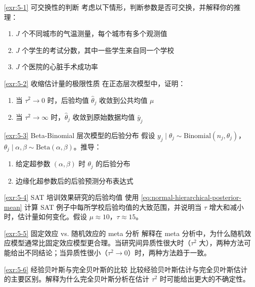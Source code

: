 \begin{Exercise}{\ref{exr:5-1} 可交换性的判断}\label{exr:5-1}
考虑以下情形，判断参数是否可交换，并解释你的推理：
\begin{enumerate}
  \item $J$ 个不同城市的气温测量，每个城市有多个观测值
  \item $J$ 个学生的考试分数，其中一些学生来自同一个学校
  \item $J$ 个医院的心脏手术成功率
\end{enumerate}
\end{Exercise}

\begin{Exercise}{\ref{exr:5-2} 收缩估计量的极限性质}\label{exr:5-2}
在正态层次模型中，证明：
\begin{enumerate}
  \item 当 $\tau^2 \to 0$ 时，后验均值 $\hat{\theta}_j$ 收敛到公共均值 $\mu$
  \item 当 $\tau^2 \to \infty$ 时，$\hat{\theta}_j$ 收敛到原始数据均值 $\bar{y}_j$
\end{enumerate}
\end{Exercise}

\begin{Exercise}{\ref{exr:5-3} Beta-Binomial 层次模型的后验分布}\label{exr:5-3}
假设 $y_j \mid \theta_j \sim \mathrm{Binomial}(n_j, \theta_j)$，$\theta_j \mid \alpha, \beta \sim \mathrm{Beta}(\alpha, \beta)$。推导：
\begin{enumerate}
  \item 给定超参数 $(\alpha, \beta)$ 时 $\theta_j$ 的后验分布
  \item 边缘化超参数后的后验预测分布表达式
\end{enumerate}
\end{Exercise}

\begin{Exercise}{\ref{exr:5-4} SAT 培训效果研究的后验均值}\label{exr:5-4}
使用 \eqref{eq:normal-hierarchical-posterior-mean} 计算 SAT 例子中每所学校后验均值的大致范围，并说明当 $\tau$ 增大和减小时，估计量如何变化。假设 $\mu \approx 10$，$\tau \approx 15$。
\end{Exercise}

\begin{Exercise}{\ref{exr:5-5} 固定效应 vs. 随机效应的 meta 分析}\label{exr:5-5}
解释在 meta 分析中，为什么随机效应模型通常比固定效应模型更合理。当研究间异质性很大时（$\tau^2$ 大），两种方法可能给出不同结论；当异质性很小（$\tau^2 \to 0$）时，两种方法趋于一致。
\end{Exercise}

\begin{Exercise}{\ref{exr:5-6} 经验贝叶斯与完全贝叶斯的比较}\label{exr:5-6}
比较经验贝叶斯估计与完全贝叶斯估计的主要区别。解释为什么完全贝叶斯分析在估计 $\tau^2$ 时可能给出更大的不确定性。
\end{Exercise}

\endinput
